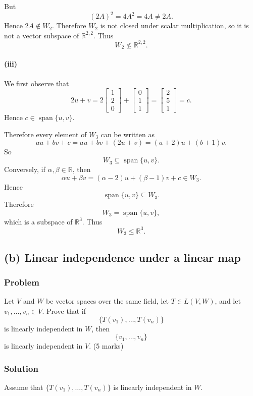 \documentclass[12pt]{article}
\newcommand{\R}{\mathbb{R}}
\newcommand{\Span}{\operatorname{span}}
\begin{document}
But
\[
(2A)^2=4A^2=4A\neq 2A.
\]
Hence \(2A\notin W_2\). Therefore \(W_2\) is not closed under scalar multiplication, so it is not a vector subspace of \(\R^{2,2}\). Thus
\[
\boxed{W_2\not\le \R^{2,2}.}
\]

\paragraph{(iii)}
We first observe that
\[
2u+v
=
2\begin{bmatrix}1\\2\\0\end{bmatrix}
+
\begin{bmatrix}0\\1\\1\end{bmatrix}
=
\begin{bmatrix}2\\5\\1\end{bmatrix}
=c.
\]
Hence \(c\in \Span\{u,v\}\).

Therefore every element of \(W_3\) can be written as
\[
au+bv+c=au+bv+(2u+v)=(a+2)u+(b+1)v.
\]
So
\[
W_3\subseteq \Span\{u,v\}.
\]
Conversely, if \(\alpha,\beta\in\R\), then
\[
\alpha u+\beta v=(\alpha-2)u+(\beta-1)v+c\in W_3.
\]
Hence
\[
\Span\{u,v\}\subseteq W_3.
\]
Therefore
\[
W_3=\Span\{u,v\},
\]
which is a subspace of \(\R^3\). Thus
\[
\boxed{W_3\le \R^3.}
\]

\subsection{(b) Linear independence under a linear map}
\subsubsection{Problem}

Let \(V\) and \(W\) be vector spaces over the same field, let \(T\in L(V,W)\), and let \(v_1,\dots,v_n\in V\). Prove that if
\[
\{T(v_1),\dots,T(v_n)\}
\]
is linearly independent in \(W\), then
\[
\{v_1,\dots,v_n\}
\]
is linearly independent in \(V\).
\hfill (5 marks)

\subsubsection{Solution}

Assume that \(\{T(v_1),\dots,T(v_n)\}\) is linearly independent in \(W\).
\end{document}
